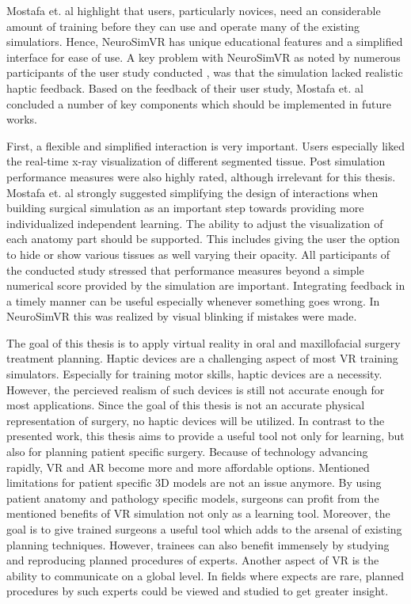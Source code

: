 Mostafa et. al highlight that users, particularly novices, need an considerable amount of training before they can use and operate many of the existing simulatiors.
Hence, NeuroSimVR has unique educational features and a simplified interface for ease of use.
A key problem with NeuroSimVR as noted by numerous participants of the user study conducted \cite{RN71}, was that the simulation lacked realistic haptic feedback. 
Based on the feedback of their user study, Mostafa et. al concluded a number of key components which should be implemented in future works.

First, a flexible and simplified interaction is very important.
Users especially liked the real-time x-ray visualization of different segmented tissue.
Post simulation performance measures were also highly rated, although irrelevant for this thesis.
Mostafa et. al strongly suggested simplifying the design of interactions when building surgical simulation as an important step towards providing more individualized independent learning.
The ability to adjust the visualization of each anatomy part should be supported.
This includes giving the user the option to hide or show various tissues as well varying their opacity.
All participants of the conducted study stressed that performance measures beyond a simple numerical score provided by the simulation are important.
Integrating feedback in a timely manner can be useful especially whenever something goes wrong.
In NeuroSimVR this was realized by visual blinking if mistakes were made.

The goal of this thesis is to apply virtual reality in oral and maxillofacial surgery treatment planning.
Haptic devices are a challenging aspect of most VR training simulators.
Especially for training motor skills, haptic devices are a necessity.
However, the percieved realism of such devices is still not accurate enough for most applications.
Since the goal of this thesis is not an accurate physical representation of surgery, no haptic devices will be utilized.
In contrast to the presented work, this thesis aims to provide a useful tool not only for learning, but also for planning patient specific surgery.
Because of technology advancing rapidly, VR and AR become more and more affordable options.
Mentioned limitations for patient specific 3D models are not an issue anymore.
By using patient anatomy and pathology specific models, surgeons can profit from the mentioned benefits of VR simulation not only as a learning tool.
Moreover, the goal is to give trained surgeons a useful tool which adds to the arsenal of existing planning techniques.
However, trainees can also benefit immensely by studying and reproducing planned procedures of experts.
Another aspect of VR is the ability to communicate on a global level. 
In fields where expects are rare, planned procedures by such experts could be viewed and studied to get greater insight.